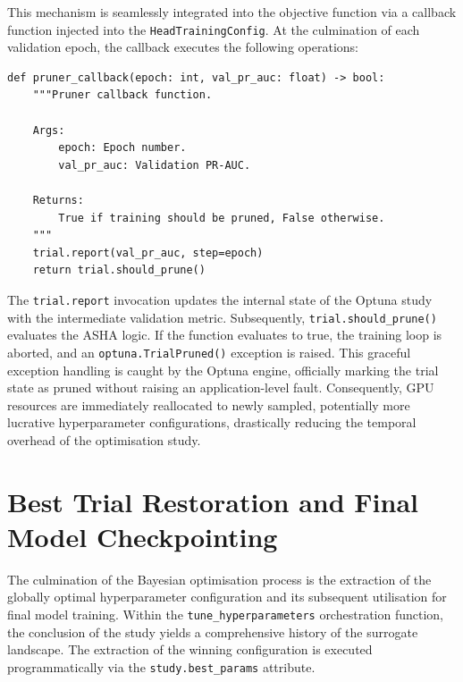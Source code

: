 This mechanism is seamlessly integrated into the objective function via a callback function injected into the \texttt{HeadTrainingConfig}. At the culmination of each validation epoch, the callback executes the following operations:
\begin{listing}[htbp]
\begin{verbatim}
def pruner_callback(epoch: int, val_pr_auc: float) -> bool:
    """Pruner callback function.

    Args:
        epoch: Epoch number.
        val_pr_auc: Validation PR-AUC.

    Returns:
        True if training should be pruned, False otherwise.
    """
    trial.report(val_pr_auc, step=epoch)
    return trial.should_prune()
\end{verbatim}
\caption{Pruning Callback Implementation in \texttt{HyperparameterObjective}}
\label{lst:pruner_callback}
\end{listing}

The \texttt{trial.report} invocation updates the internal state of the Optuna study with the intermediate validation metric. Subsequently, \texttt{trial.should\_prune()} evaluates the ASHA logic. If the function evaluates to true, the training loop is aborted, and an \texttt{optuna.TrialPruned()} exception is raised. This graceful exception handling is caught by the Optuna engine, officially marking the trial state as pruned without raising an application-level fault. Consequently, GPU resources are immediately reallocated to newly sampled, potentially more lucrative hyperparameter configurations, drastically reducing the temporal overhead of the optimisation study.

\section{Best Trial Restoration and Final Model Checkpointing}
\label{sec:best_trial_restoration}

The culmination of the Bayesian optimisation process is the extraction of the globally optimal hyperparameter configuration and its subsequent utilisation for final model training. Within the \texttt{tune\_hyperparameters} orchestration function, the conclusion of the study yields a comprehensive history of the surrogate landscape. The extraction of the winning configuration is executed programmatically via the \texttt{study.best\_params} attribute.

